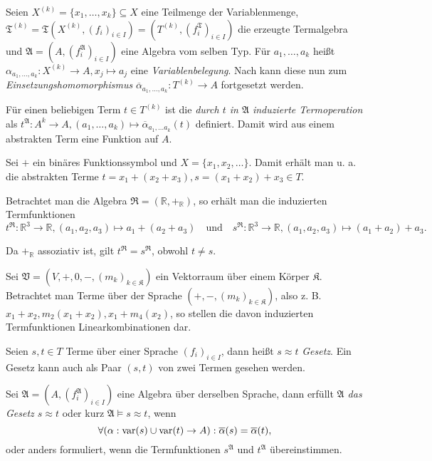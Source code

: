 \vspace*{-\lineskip}

\begin{definition}
    Seien $X^{(k)} = \{x_1, \ldots, x_k\} \subseteq X$ eine Teilmenge der Variablenmenge, $\mathfrak{T}^{(k)} = \mathfrak{T}(X^{(k)}, (f_i)_{i \in I}) = (T^{(k)}, (f_i^\mathfrak{T})_{i \in I})$ die erzeugte Termalgebra und $\mathfrak{A} = (A, (f_i^\mathfrak{A})_{i \in I})$ eine Algebra vom selben Typ. Für $a_1, \ldots, a_k$ heißt $\alpha_{a_1, \ldots, a_k}: X^{(k)} \to A, x_j \mapsto a_j$ eine \emph{Variablenbelegung}. Nach  kann diese nun zum \emph{Einsetzungshomomorphismus} $\overline{\alpha}_{a_1, \ldots, a_k}: T^{(k)} \to A$ fortgesetzt werden.

    Für einen beliebigen Term $t \in T^{(k)}$ ist die \emph{durch $t$ in $\mathfrak{A}$ induzierte Termoperation} als $t^\mathfrak{A}: A^k \to A, (a_1, \ldots, a_k) \mapsto \overline{\alpha}_{a_1, \ldots a_k}(t)$ definiert. Damit wird aus einem abstrakten Term eine Funktion auf $A$.
\end{definition}

\begin{example}
    Sei $+$ ein binäres Funktionssymbol und $X = \{x_1, x_2, \ldots \}$. Damit erhält man u. a. die abstrakten Terme $t = x_1 + (x_2 + x_3), s = (x_1 + x_2) + x_3 \in T$.

    Betrachtet man die Algebra $\mathfrak{R} = (\mathbb{R}, +_\mathbb{R})$, so erhält man die induzierten Termfunktionen $$t^\mathfrak{R}: \mathbb{R}^3 \to \mathbb{R}, (a_1, a_2, a_3) \mapsto a_1 + (a_2 + a_3) \quad \text{und} \quad s^\mathfrak{R}: \mathbb{R}^3 \to \mathbb{R}, (a_1, a_2, a_3) \mapsto (a_1 + a_2) + a_3.$$

    Da $+_\mathbb{R}$ assoziativ ist, gilt $t^\mathfrak{R} = s^\mathfrak{R}$, obwohl $t \neq s$.
\end{example}

\begin{example}
    Sei $\mathfrak{V} = (V, +, 0, -, (m_k)_{k \in \mathfrak{K}})$ ein Vektorraum über einem Körper $\mathfrak{K}$. Betrachtet man Terme über der Sprache $(+, -, (m_k)_{k \in \mathfrak{K}})$, also z. B. $x_1 + x_2, m_2(x_1 + x_2), x_1 + m_4(x_2)$, so stellen die davon induzierten Termfunktionen Linearkombinationen dar.
\end{example}

\begin{definition}
    Seien $s, t \in T$ Terme über einer Sprache $(f_i)_{i \in I}$, dann heißt $s \approx t$ \emph{Gesetz}. Ein Gesetz kann auch als Paar $(s, t)$ von zwei Termen gesehen werden.

    Sei $\mathfrak{A} = (A, (f_i^\mathfrak{A})_{i \in I})$ eine Algebra über derselben Sprache, dann erfüllt \emph{$\mathfrak{A}$ das Gesetz $s \approx t$} oder kurz \emph{$\mathfrak{A} \models s \approx t$}, wenn 
    $$ \forall (\alpha: \operatorname{var}(s) \cup \operatorname{var}(t) \to A): \overline{\alpha}(s) = \overline{\alpha}(t), $$
    oder anders formuliert, wenn die Termfunktionen $s^\mathfrak{A}$ und $t^\mathfrak{A}$ übereinstimmen.
\end{definition}